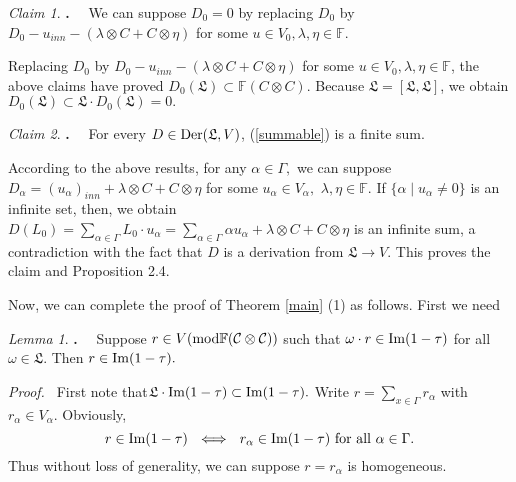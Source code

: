 \documentclass{amsart}
\theoremstyle{definition}
\theoremstyle{remark}
\numberwithin{equation}{subsection}
\numberwithin{equation}{section}
\newtheorem{lemm}[theo]{Lemma}
\newtheorem{clai}{Claim}
\begin{document}
\begin{clai}{$\!\!\!${\bf.}\ \ } \label{clai4} \rm
We can suppose $D_0=0$ by replacing $D_0$ by
$D_0-u_{inn}-(\lambda\otimes C+C \otimes \eta)$ for some $u\in V_0,
\lambda, \eta\in \mathbb{F}.$
\end{clai}
\vskip4pt
\par

Replacing $D_0$ by $D_0-u_{inn}-(\lambda\otimes C+C \otimes \eta)$
for some $u\in V_0,\lambda, \eta\in \mathbb{F}$, the above claims
have proved $D_0(\mathfrak{L})\subset \mathbb{F} (C\otimes C)$.
Because $\mathfrak{L}=[\mathfrak{L},\mathfrak{L}]$, we obtain
$D_0(\mathfrak{L})\subset \mathfrak{L} \cdot D_0(\mathfrak{L})=0.$

\begin{clai}{$\!\!\!${\bf.}\ \ } \label{clai5} \rm
For every $D\in{\rm Der}(\mathfrak{L},V)$, (\ref{summable}) is a
finite sum.
\end{clai}
\vskip4pt
\par According to the above results, for any $\alpha\in \Gamma,$
we can suppose $D_\alpha=(u_\alpha)_{inn}+\lambda\otimes C+C\otimes
\eta$ for some $u_\alpha\in V_\alpha,$ $\lambda,\eta\in \mathbb{F}.$
If $\{\alpha \mid u_\alpha \neq 0\}$ is an infinite set, then, we
obtain $D(L_0)= \underset{\alpha\in \Gamma}{\sum}L_0\cdot
u_\alpha=\underset{\alpha\in \Gamma}{\sum} \alpha
u_\alpha+\lambda\otimes C+C \otimes \eta$ is an infinite sum, a
contradiction with the fact that $D$ is a derivation from
$\mathfrak{L}\rightarrow V$. This proves the claim and Proposition
2.4.

Now, we can complete the proof of Theorem \ref{main} {\rm(1)} as
follows. First we need

\begin{lemm}{$\!\!\!${\bf.}\ \ }
\label{lemma3??} Suppose $r\in V ( {\rm mod } \mathbb{F}(\mathcal
{C}\otimes \mathcal {C}))$ such that $\omega\cdot r\in {\rm
Im}(1-\tau)$ for all $\omega\in \mathfrak{L} .$ Then $r\in {\rm
Im}(1-\tau).$
\end{lemm}

{\noindent}{\it Proof.~} First note that$\mathfrak{L} \cdot {\rm
Im}(1-\tau)\subset {\rm Im}(1-\tau).$
 Write $r=\sum_{x\in \Gamma}r_\alpha$ with $r_\alpha \in V_\alpha.$ Obviously,
 \begin{equation}
 \label{equa2.36}
 r\in {\rm Im}(1-\tau)\ \ \Longleftrightarrow \ \ r_\alpha \in {\rm Im}(1-\tau)
 \mbox{ for all } \alpha\in \Gamma.
 \end{equation}
Thus without loss of generality, we can suppose $r=r_\alpha$ is
 homogeneous.
\end{document}
